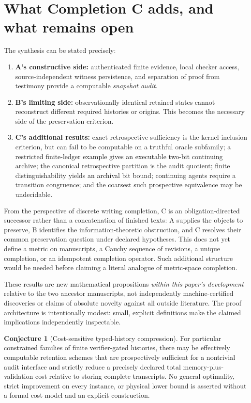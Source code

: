 \documentclass[11pt,letterpaper]{article}
\theoremstyle{definition}
\newtheorem{conjecture}[theorem]{Conjecture}
\begin{document}
\section{What Completion C adds, and what remains open}
The synthesis can be stated precisely:
\begin{enumerate}[label=\arabic*.]
\item \textbf{A's constructive side:} authenticated finite evidence, local checker access, source-independent witness persistence, and separation of proof from testimony provide a computable \emph{snapshot audit}.
\item \textbf{B's limiting side:} observationally identical retained states cannot reconstruct different required histories or origins. This becomes the necessary side of the preservation criterion.
\item \textbf{C's additional results:} exact retrospective sufficiency is the kernel-inclusion criterion, but can fail to be computable on a truthful oracle subfamily; a restricted finite-ledger example gives an executable two-bit continuing archive; the canonical retrospective partition is the audit quotient; finite distinguishability yields an archival bit bound; continuing agents require a transition congruence; and the coarsest such prospective equivalence may be undecidable.
\end{enumerate}

From the perspective of discrete writing completion, C is an obligation-directed successor rather than a concatenation of finished texts: A supplies the objects to preserve, B identifies the information-theoretic obstruction, and C resolves their common preservation question under declared hypotheses. This does not yet define a metric on manuscripts, a Cauchy sequence of revisions, a unique completion, or an idempotent completion operator. Such additional structure would be needed before claiming a literal analogue of metric-space completion.

These results are new mathematical propositions \emph{within this paper's development} relative to the two ancestor manuscripts, not independently machine-certified discoveries or claims of absolute novelty against all outside literature. The proof architecture is intentionally modest: small, explicit definitions make the claimed implications independently inspectable.

\begin{conjecture}[Cost-sensitive typed-history compression]
For particular constrained families of finite verifier-gated histories, there may be effectively computable retention schemes that are prospectively sufficient for a nontrivial audit interface and strictly reduce a precisely declared total memory-plus-validation cost relative to storing complete transcripts. No general optimality, strict improvement on every instance, or physical lower bound is asserted without a formal cost model and an explicit construction.
\end{conjecture}
\end{document}
